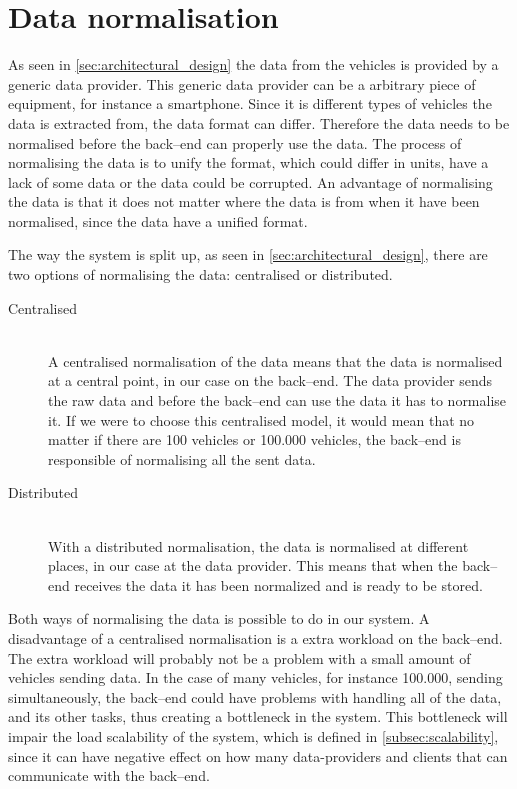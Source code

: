 \section{Data normalisation}
As seen in \cref{sec:architectural_design} the data from the vehicles is provided by a generic data provider.
This generic data provider can be a arbitrary piece of equipment, for instance a smartphone. 
Since it is different types of vehicles the data is extracted from, the data format can differ.
Therefore the data needs to be normalised before the back--end can properly use the data.
The process of normalising the data is to unify the format, which could differ in units, have a lack of some data or the data could be corrupted.
An advantage of normalising the data is that it does not matter where the data is from when it have been normalised, since the data have a unified format.

The way the system is split up, as seen in \cref{sec:architectural_design}, there are two options of normalising the data: centralised or distributed.

\begin{description}
    \item[Centralised] \hfill \\
    A centralised normalisation of the data means that the data is normalised at a central point, in our case on the back--end.
    The data provider sends the raw data and before the back--end can use the data it has to normalise it.
    If we were to choose this centralised model, it would mean that no matter if there are 100 vehicles or 100.000 vehicles, 
    the back--end is responsible of normalising all the sent data.
    
    \item[Distributed] \hfill \\
    With a distributed normalisation, the data is normalised at different places, in our case at the data provider. 
    This means that when the back--end receives the data it has been normalized and is ready to be stored.
\end{description}
\bigskip

Both ways of normalising the data is possible to do in our system.
A disadvantage of a centralised normalisation is a extra workload on the back--end.
The extra workload will probably not be a problem with a small amount of vehicles sending data.
In the case of many vehicles, for instance 100.000, sending simultaneously, the back--end could have problems with handling all of the data,
and its other tasks, thus creating a bottleneck in the system.
This bottleneck will impair the load scalability of the system, which is defined in \cref{subsec:scalability},
since it can have negative effect on how many data-providers and clients that can communicate with the back--end.

